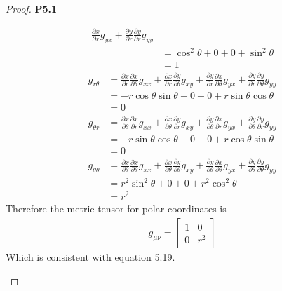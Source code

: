 \documentclass[11pt]{article}
\theoremstyle{definition}
\begin{document}
\begin{proof}{\textbf{P5.1}}
\begin{itemize}
\begin{align*}
        \frac{\partial x}{\partial r} g_{yx} + \frac{\partial y}{\partial r}
        \frac{\partial y}{\partial r} g_{yy}\\
        &= \cos^2\theta + 0 + 0 + \sin^2\theta\\
        &= 1
    \end{align*}
    \begin{align*}
        g_{r \theta} &= \frac{\partial x}{\partial r}
        \frac{\partial x}{\partial \theta} g_{xx} +
        \frac{\partial x}{\partial r}
        \frac{\partial y}{\partial \theta} g_{xy} +
        \frac{\partial y}{\partial r}
        \frac{\partial x}{\partial \theta} g_{yx} +
        \frac{\partial y}{\partial r}
        \frac{\partial y}{\partial \theta} g_{yy}\\
        &= -r\cos\theta\sin\theta + 0 + 0 + r\sin\theta\cos\theta\\
        &= 0
    \end{align*}
    \begin{align*}
        g_{\theta r} &= \frac{\partial x}{\partial \theta}
        \frac{\partial x}{\partial r} g_{xx} +
        \frac{\partial x}{\partial \theta}
        \frac{\partial y}{\partial r} g_{xy} +
        \frac{\partial y}{\partial \theta}
        \frac{\partial x}{\partial r} g_{yx} +
        \frac{\partial y}{\partial \theta}
        \frac{\partial y}{\partial r} g_{yy}\\
        &= -r\sin\theta\cos\theta + 0 + 0 + r\cos\theta\sin\theta\\
        &= 0
    \end{align*}
    \begin{align*}
        g_{\theta \theta} &= \frac{\partial x}{\partial \theta}
        \frac{\partial x}{\partial \theta} g_{xx} +
        \frac{\partial x}{\partial \theta}
        \frac{\partial y}{\partial \theta} g_{xy} +
        \frac{\partial y}{\partial \theta}
        \frac{\partial x}{\partial \theta} g_{yx} +
        \frac{\partial y}{\partial \theta}
        \frac{\partial y}{\partial \theta} g_{yy}\\
        &= r^2\sin^2\theta + 0 + 0 + r^2\cos^2\theta\\
        &= r^2
    \end{align*}
    Therefore the metric tensor for polar coordinates is
    \begin{align*}
        g_{\mu\nu} = \begin{bmatrix}
            1 & 0 \\ 0 & r^2
        \end{bmatrix}
    \end{align*}
    Which is consistent with equation 5.19.
\end{itemize}
\end{proof}
\end{document}
